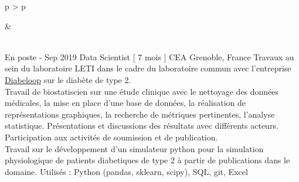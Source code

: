 \documentclass[cv]{cv_style}
\begin{document}
{\begin{tabular}{p{\leftsize\textwidth} > {\arraybackslash}p{\rightsize\textwidth}}
\begin{minipage}[t]{\leftsize\textwidth}
    \end{minipage}
&
    \hspace{0.4cm}
    \begin{minipage}[t]{\rightsize\textwidth}
    

    \vspace{-0.2cm}\\
    
    \frcventrycurrent
				{En poste - \hspace{0.6cm}}
				{Sep 2019   \hspace{0.6cm}}
				{Data Scientist \hfill  [ 7 mois ] }
        {CEA}
        {Grenoble, France}
        {
					Travaux au sein du laboratoire LETI dans le cadre du laboratoire commun avec l'entreprise \href{https://www.diabeloop.fr/}{Diabeloop} sur le diabète de type 2. \\
					\vspace{0.0cm} 
          \rightchevron\hspace{.1cm} Travail de biostatiscien sur une étude clinique avec le nettoyage des données médicales, la mise en place d'une base de données, la réalisation de représentations graphiques, la recherche de métriques pertinentes, l'analyse statistique. Présentations et discussions des résultats avec différents acteurs. Participation aux activités de soumission et de publication.\\
					\vspace{0.0cm} 
          \rightchevron\hspace{.1cm} Travail sur le développement d'un simulateur python pour la simulation physiologique de patients diabetiques de type 2 à partir de publications dans le domaine.
        }
        {Utilisés :}
				{Python (pandas, sklearn, scipy), SQL, git, Excel}

    \vspace{0.6cm}\\


\end{minipage}
\end{tabular}}
\end{document}
